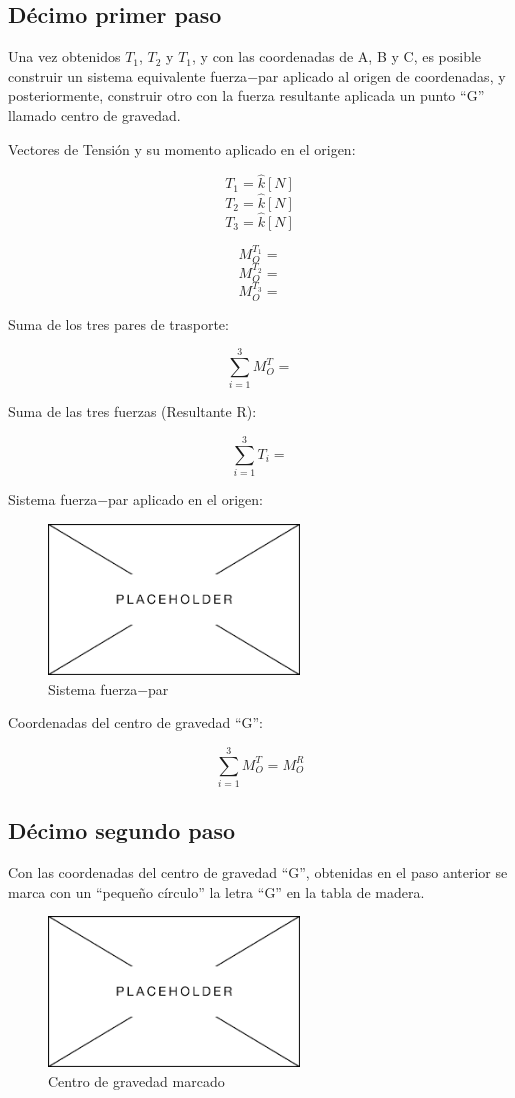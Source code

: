 \documentclass[12pt, titlepage]{report}
\begin{document}
    \subsection*{Décimo primer paso}
    Una vez obtenidos $T_{1}$, $T_{2}$ y $T_{1}$, y con las coordenadas de A, B y C, es posible construir un sistema equivalente fuerza$-$par aplicado al origen de coordenadas, y posteriormente, construir otro con la fuerza resultante aplicada un punto ``G'' llamado centro de gravedad.

    Vectores de Tensión y su momento aplicado en el origen:

    $$T_{1} =  \hat{k} [N]$$
    $$T_{2} =  \hat{k} [N]$$
    $$T_{3} =  \hat{k} [N]$$

    $$M^{T_{1}}_{O} = $$
    $$M^{T_{2}}_{O} = $$
    $$M^{T_{3}}_{O} = $$

    Suma de los tres pares de trasporte:
    
    $$\sum_{i = 1}^{3} M^T_{O} =$$

    Suma de las tres fuerzas (Resultante R):

    $$\sum_{i = 1}^{3} T_{i} =$$

    Sistema fuerza$-$par aplicado en el origen:

    \begin{figure}[ht]
        \centering
        \includegraphics[height=4cm]{Placeholder.png}
        \caption{Sistema fuerza$-$par}
    \end{figure}

    Coordenadas del centro de gravedad ``G'':

    $$\sum_{i=1}^{3} M^T_{O} = M^R_{O}$$

    \subsection*{Décimo segundo paso}
    Con las coordenadas del centro de gravedad ``G'', obtenidas en el paso anterior se marca con un ``pequeño círculo'' la letra ``G'' en la tabla de madera.

    \begin{figure}[ht]
        \centering
        \includegraphics[height=4cm]{Placeholder.png}
        \caption{Centro de gravedad marcado}
    \end{figure}
\end{document}
